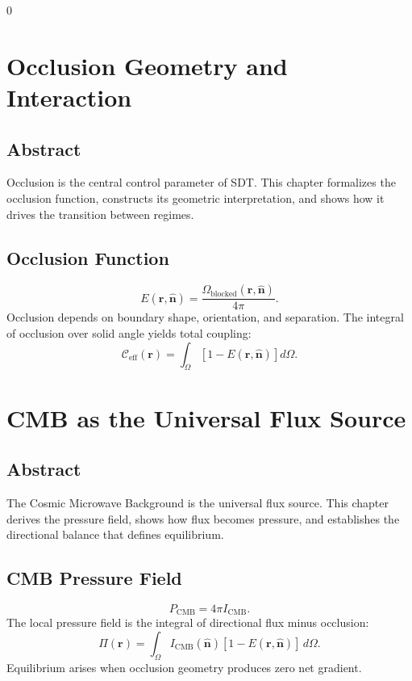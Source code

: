 0\documentclass[12pt]{book}
\begin{document}
\chapter{Occlusion Geometry and Interaction}

\section*{Abstract}
Occlusion is the central control parameter of SDT. This chapter formalizes the occlusion function,
constructs its geometric interpretation, and shows how it drives the transition between regimes.

\section{Occlusion Function}
\begin{equation}
E(\mathbf{r},\hat{\mathbf{n}}) = \frac{\Omega_{\text{blocked}}(\mathbf{r},\hat{\mathbf{n}})}{4\pi}.
\end{equation}
Occlusion depends on boundary shape, orientation, and separation. The integral of occlusion over solid
angle yields total coupling:
\begin{equation}
\mathcal{C}_{\text{eff}}(\mathbf{r}) = \int_{\Omega}\left[1 - E(\mathbf{r},\hat{\mathbf{n}})\right] d\Omega.
\end{equation}

\chapter{CMB as the Universal Flux Source}

\section*{Abstract}
The Cosmic Microwave Background is the universal flux source. This chapter derives the pressure field,
shows how flux becomes pressure, and establishes the directional balance that defines equilibrium.

\section{CMB Pressure Field}
\begin{equation}
P_{\text{CMB}} = 4\pi I_{\text{CMB}}.
\end{equation}
The local pressure field is the integral of directional flux minus occlusion:
\begin{equation}
\Pi(\mathbf{r}) = \int_{\Omega} I_{\text{CMB}}(\hat{\mathbf{n}})\left[1 - E(\mathbf{r},\hat{\mathbf{n}})\right]\, d\Omega.
\end{equation}
Equilibrium arises when occlusion geometry produces zero net gradient.
\end{document}

